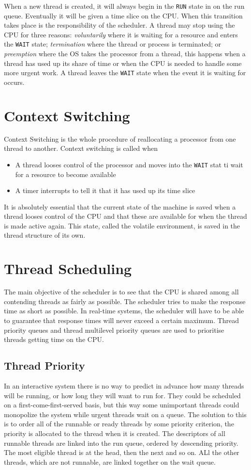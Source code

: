 When a new thread is created, it will always begin in the \verb|RUN| state in on the run queue. Eventually it will be given a time slice on the CPU. When this transition takes place is the responsibility of the scheduler. A thread may stop using the CPU for three reasons: \textit{voluntarily} where it is waiting for a resource and enters the \verb|WAIT| state; \textit{termination} where the thread or process is terminated; or \textit{preemption} where the OS takes the processor from a thread, this happens when a thread has used up its share of time or when the CPU is needed to handle some more urgent work. A thread leaves the \verb|WAIT| state when the event it is waiting for occurs. 

\section*{Context Switching}
Context Switching is the whole procedure of reallocating a processor from one thread to another. Context switching is called when
\begin{itemize}
    \item A thread looses control of the processor and moves into the \verb|WAIT| stat ti wait for a resource to become available
    \item A timer interrupts to tell it that it has used up its time slice
\end{itemize}
It is absolutely essential that the current state of the machine is saved when a thread looses control of the CPU and that these are available for when the thread is made active again. This state, called the volatile environment, is saved in the thread structure of its own. 

\section*{Thread Scheduling}
The main objective of the scheduler is to see that the CPU is shared among all contending threads as fairly as possible. The scheduler tries to make the response time as short as possible. In real-time systems, the scheduler will have to be able to guarantee that response times will never exceed a certain maximum. Thread priority queues and thread multilevel priority queues are used to prioritise threads getting time on the CPU.

\subsection*{Thread Priority}
In an interactive system there is no way to predict in advance how many threads will be running, or how long they will want to run for. They could be scheduled on a first-come-first-served basis, but this way some unimportant threads could monopolize the system while urgent threads wait on a queue. The solution to this is to order all of the runnable or ready threads by some priority criterion, the priority is allocated to the thread when it is created. The descriptors of all runnable threads are linked into the run queue, ordered by descending priority. The most eligible thread is at the head, then the next and so on. ALl the other threads, which are not runnable, are linked together on the wait queue. 

